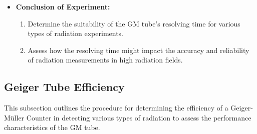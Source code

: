 \documentclass[11pt]{article}
\begin{document}
\begin{itemize}
		\item \textbf{Conclusion of Experiment:}
		\begin{enumerate}
			\item Determine the suitability of the GM tube's resolving time for various types of radiation experiments.
			\item Assess how the resolving time might impact the accuracy and reliability of radiation measurements in high radiation fields.
		\end{enumerate}
	\end{itemize}
	
	\subsection{Geiger Tube Efficiency}
	
	This subsection outlines the procedure for determining the efficiency of a Geiger-Müller Counter in detecting various types of radiation to assess the performance characteristics of the GM tube.
	
\end{document}
